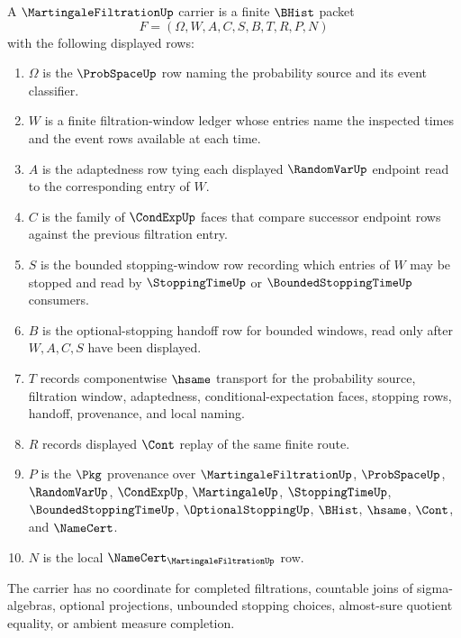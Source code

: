 \begin{definition}
\label{def:martingale-filtration-carrier}
A $\MartingaleFiltrationUp$ carrier is a finite $\BHist$ packet
$$
F=(\Omega,W,A,C,S,B,T,R,P,N)
$$
with the following displayed rows:
\begin{enumerate}
\item $\Omega$ is the $\ProbSpaceUp$ row naming the probability source and its event classifier.
\item $W$ is a finite filtration-window ledger whose entries name the inspected times and the event rows available at each time.
\item $A$ is the adaptedness row tying each displayed $\RandomVarUp$ endpoint read to the corresponding entry of $W$.
\item $C$ is the family of $\CondExpUp$ faces that compare successor endpoint rows against the previous filtration entry.
\item $S$ is the bounded stopping-window row recording which entries of $W$ may be stopped and read by $\StoppingTimeUp$ or $\BoundedStoppingTimeUp$ consumers.
\item $B$ is the optional-stopping handoff row for bounded windows, read only after $W,A,C,S$ have been displayed.
\item $T$ records componentwise $\hsame$ transport for the probability source, filtration window, adaptedness, conditional-expectation faces, stopping rows, handoff, provenance, and local naming.
\item $R$ records displayed $\Cont$ replay of the same finite route.
\item $P$ is the $\Pkg$ provenance over $\MartingaleFiltrationUp$, $\ProbSpaceUp$, $\RandomVarUp$, $\CondExpUp$, $\MartingaleUp$, $\StoppingTimeUp$, $\BoundedStoppingTimeUp$, $\OptionalStoppingUp$, $\BHist$, $\hsame$, $\Cont$, and $\NameCert$.
\item $N$ is the local $\NameCert_{\MartingaleFiltrationUp}$ row.
\end{enumerate}
The carrier has no coordinate for completed filtrations, countable joins of sigma-algebras, optional projections, unbounded stopping choices, almost-sure quotient equality, or ambient measure completion.
\end{definition}

